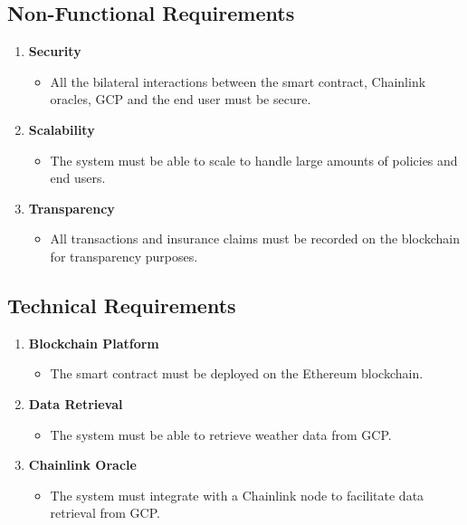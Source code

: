 \subsection{Non-Functional Requirements}
\begin{enumerate}
    \item \textbf{Security}
    \begin{itemize}
        \item All the bilateral interactions between the smart contract, Chainlink oracles, GCP and the end user must be secure.
    \end{itemize}
    
    \item \textbf{Scalability}
    \begin{itemize}
        \item The system must be able to scale to handle large amounts of policies and end users.
    \end{itemize}
    
    \item \textbf{Transparency}
    \begin{itemize}
        \item All transactions and insurance claims must be recorded on the blockchain for transparency purposes.
    \end{itemize}
\end{enumerate}

\subsection{Technical Requirements}\label{subsection:technicalRequirements}
\begin{enumerate}
    \item \textbf{Blockchain Platform}
    \begin{itemize}
        \item The smart contract must be deployed on the Ethereum blockchain.
    \end{itemize}
    
    \item \textbf{Data Retrieval}
    \begin{itemize}
        \item The system must be able to retrieve weather data from GCP.
    \end{itemize}
    
    \item \textbf{Chainlink Oracle}
    \begin{itemize}
        \item The system must integrate with a Chainlink node to facilitate data retrieval from GCP.
    \end{itemize}
\end{enumerate}

